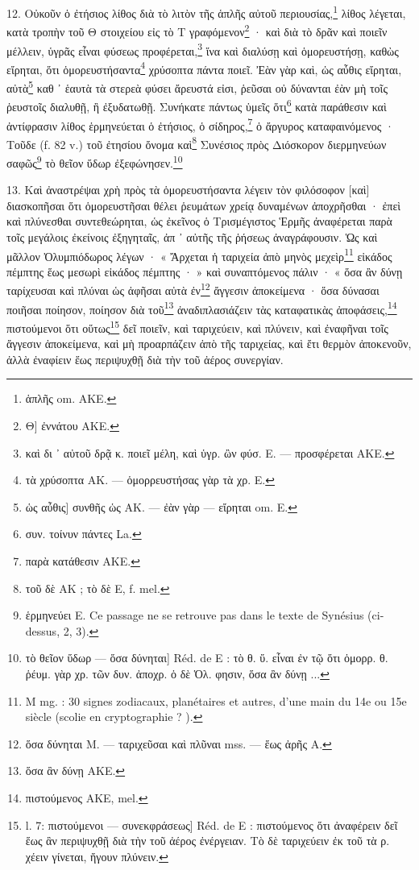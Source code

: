 \documentclass[a4paper, 11pt, oneside, polutonikogreek, french]{article}
\begin{document}
12. Οὐκοῦν ὁ ἐτήσιος λίθος διὰ τὸ λιτὸν τῆς ἁπλῆς αὐτοῦ περιουσίας,\footnote{ἁπλῆς om. AKE.} λίθος λέγεται, κατὰ τροπὴν τοῦ Θ στοιχείου εἰς τὸ Τ γραφόμενον\footnote{Θ] ἐννάτου AKE.} · καὶ διὰ τὸ δρᾶν καὶ ποιεῖν μέλλειν, ὑγρᾶς εἶναι φύσεως προφέρεται,\footnote{καὶ δι ᾽ αὐτοῦ δρᾷ κ. ποιεῖ μέλη, καὶ ὑγρ. ὢν φύσ. E. --- προσφέρεται AKE.} ἵνα καὶ διαλύσῃ καὶ ὁμορευστήσῃ, καθὼς εἴρηται, ὅτι ὁμορευστήσαντα\footnote{τὰ χρύσοπτα AK. --- ὁμορρευστήσας γὰρ τὰ χρ. E.} χρύσοπτα πάντα ποιεῖ. Ἐὰν γὰρ καὶ, ὡς αὖθις εἴρηται, αὐτὰ\footnote{ὡς αὖθις] συνθῆς ὡς AΚ. --- ἐὰν γὰρ --- εἴρηται om. E.} καθ ᾽ ἑαυτὰ τὰ στερεὰ φύσει ἄρευστά εἰσι, ῥεῦσαι οὐ δύνανται ἐὰν μὴ τοῖς ῥευστοῖς διαλυθῇ, ἢ ἐξυδατωθῇ. Συνήκατε πάντως ὑμεῖς ὅτι\footnote{συν. τοίνυν πάντες La.} κατὰ παράθεσιν καὶ ἀντίφρασιν λίθος ἑρμηνεύεται ὁ ἐτήσιος, ὁ σίδηρος,\footnote{παρὰ κατάθεσιν AΚE.} ὁ ἄργυρος καταφαινόμενος · Τοῦδε (f. 82 v.) τοῦ ἐτησίου ὄνομα καὶ\footnote{τοῦ δὲ AK ; τὸ δὲ E, f. mel.} Συνέσιος πρὸς Διόσκορον διερμηνεύων σαφῶς\footnote{ἑρμηνεύει E. Ce passage ne se retrouve pas dans le texte de Synésius (ci-dessus, 2, 3).} τὸ θεῖον ὕδωρ ἐξεφώνησεν.\footnote{τὸ θεῖον ὕδωρ --- ὅσα δύνηται] Réd. de E : τὸ θ. ὕ. εἶναι ἐν τῷ ὅτι ὁμορρ. θ. ῥέυμ. γὰρ χρ. τῶν δυν. ἀποχρ. ὁ δὲ Ὁλ. φησιν, ὅσα ἂν δύνῃ ...}

13. Καὶ ἀναστρέψαι χρὴ πρὸς τὰ ὁμορευστήσαντα λέγειν τὸν φιλόσοφον [καὶ] διασκοπῆσαι ὅτι ὁμορευστῆσαι θέλει ῥευμάτων χρείᾳ δυναμένων ἀποχρῆσθαι · ἐπεὶ καὶ πλύνεσθαι συντεθεώρηται, ὡς ἐκεῖνος ὁ Τρισμέγιστος Ἑρμῆς ἀναφέρεται παρὰ τοῖς μεγάλοις ἐκείνοις ἐξηγηταῖς, ἀπ ᾽ αὐτῆς τῆς ῥήσεως ἀναγράφουσιν. Ὡς καὶ μᾶλλον Ὀλυμπιόδωρος λέγων · « Ἄρχεται ἡ ταριχεία ἀπὸ μηνὸς μεχεὶρ\footnote{M mg. : 30 signes zodiacaux, planétaires et autres, d'une main du 14e ou 15e siècle (scolie en cryptographie ? ).} εἰκάδος πέμπτης ἕως μεσωρὶ εἰκάδος πέμπτης · » καὶ συναπτόμενος πάλιν · « ὅσα ἂν δύνῃ ταρίχευσαι καὶ πλύναι ὡς ἀφῆσαι αὐτὰ ἐν\footnote{ὅσα δύνηται M. --- ταριχεῦσαι καὶ πλῦναι mss. --- ἕως ἀρῆς A.} ἄγγεσιν ἀποκείμενα · ὅσα δύνασαι ποιῆσαι ποίησον, ποίησον διὰ τοῦ\footnote{ὅσα ἂν δύνῃ AKE.} ἀναδιπλασιάζειν τὰς καταφατικὰς ἀποφάσεις,\footnote{πιστούμενος AKE, mel.} πιστούμενοι ὅτι οὕτως\footnote{l. 7: πιστούμενοι --- συνεκφράσεως] Réd. de E : πιστούμενος ὅτι ἀναφέρειν δεῖ ἕως ἂν περιψυχθῇ διὰ τὴν τοῦ ἀέρος ἐνέργειαν. Τὸ δὲ ταριχεύειν ἐκ τοῦ τὰ ρ. χέειν γίνεται, ἤγουν πλύνειν.} δεῖ ποιεῖν, καὶ ταριχεύειν, καὶ πλύνειν, καὶ ἐναφῆναι τοῖς ἄγγεσιν ἀποκείμενα, καὶ μὴ προαρπάζειν ἀπὸ τῆς ταριχείας, καὶ ἔτι θερμὸν ἀποκενοῦν, ἀλλὰ ἐναφίειν ἕως περιψυχθῇ διὰ τὴν τοῦ ἀέρος συνεργίαν.
\end{document}
